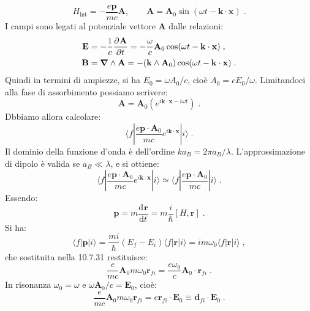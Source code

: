 \documentclass[12pt,a4paper]{report}
\theoremstyle{definition}
\newcommand{\pdev}[3][]{\frac{\partial^{#1} #2}{\partial #3^{#1}}}
\newcommand{\dev}[3][]{\frac{\mathrm{d}^{#1} #2}{\mathrm{d} #3^{#1}}}
\numberwithin{equation}{section}
\newcommand{\bra}{\langle}
\newcommand{\ket}{\rangle}
\newcommand{\bnabla}{\boldsymbol{\nabla}}
\begin{document}
\begin{equation}
H_{\mathrm{int}}=-\frac{e\mathbf{p}}{mc}\mathbf{A}, \qquad \mathbf{A}=\mathbf{A}_0\sin(\omega t-\mathbf{k}\cdot\mathbf{x})\;.
\end{equation}
I campi sono legati al potenziale vettore $\mathbf{A}$ dalle relazioni:
\begin{align}
\mathbf{E} &= -\frac{1}{c}\pdev{\mathbf{A}}{t}=-\frac{\omega}{c}\mathbf{A}_0\cos(\omega t-\mathbf{k}\cdot\mathbf{x}) \notag\;, \\
\mathbf{B} &= \bnabla\wedge \mathbf{A}=-(\mathbf{k}\wedge\mathbf{A}_0)\cos(\omega t-\mathbf{k}\cdot\mathbf{x})\;.
\end{align}
Quindi in termini di ampiezze, si ha $E_0=\omega A_0/c$, cioè $A_0=cE_0/\omega$. Limitandoci alla fase di assorbimento possiamo scrivere:
\begin{equation}
\mathbf{A}=\mathbf{A}_0\left(e^{i\mathbf{k}\cdot\mathbf{x}-i\omega t}\right)\;.
\end{equation}
Dbbiamo allora calcolare:
\begin{equation}
\bra f|\frac{e\mathbf{p}\cdot\mathbf{A}_0}{mc}e^{i\mathbf{k}\cdot\mathbf{x}}|i\ket\;.
\end{equation}
Il dominio della funzione d'onda è dell'ordine $ka_B=2\pi a_B/\lambda$. L'approssimazione di dipolo è valida se $a_B\ll \lambda$, e si ottiene:
\begin{equation}
\bra f|\frac{e\mathbf{p}\cdot\mathbf{A}_0}{mc}e^{i\mathbf{k}\cdot\mathbf{x}}|i\ket\simeq \bra f|\frac{e\mathbf{p}\cdot\mathbf{A}_0}{mc}|i\ket\;.
\end{equation}
Essendo:
\begin{equation}
\mathbf{p}=m\dev{\mathbf{r}}{t}=m\frac{i}{\hbar}[H,\mathbf{r}]\;.
\end{equation}
Si ha:
\begin{equation}
\bra f|\mathbf{p}|i\ket=\frac{mi}{\hbar}(E_f-E_i)\bra f|\mathbf{r}|i\ket=im\omega_0\bra f|\mathbf{r}|i\ket\;,
\end{equation}
che sostituita nella 10.7.31 restituisce:
\begin{equation*}
\frac{e}{mc}\mathbf{A}_0m\omega_0\mathbf{r}_{fi}=\frac{e\omega_0}{c}\mathbf{A}_0\cdot\mathbf{r}_{fi}\;.
\end{equation*}
In risonanza $\omega_0=\omega$ e $\omega \mathbf{A}_0/c=\mathbf{E}_0$, cioè:
\begin{equation}
\frac{e}{mc}\mathbf{A}_0m\omega_0\mathbf{r}_{fi}= e\mathbf{r}_{fi}\cdot\mathbf{E}_0\equiv \mathbf{d}_{fi}\cdot\mathbf{E}_0\;.
\end{equation}
\end{document}
